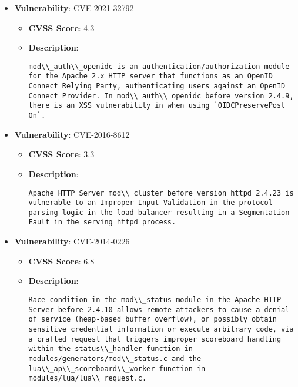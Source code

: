 \documentclass{article}
\begin{document}
\begin{itemize}
        \item \textbf{Vulnerability}: CVE-2021-32792
        \begin{itemize}
            \item \textbf{CVSS Score}:  4.3 
            \item \textbf{Description}:
            \parbox[t]{0.9\linewidth}{
                \verb|mod\\_auth\\_openidc is an authentication/authorization module for the Apache 2.x HTTP server that functions as an OpenID Connect Relying Party, authenticating users against an OpenID Connect Provider. In mod\\_auth\\_openidc before version 2.4.9, there is an XSS vulnerability in when using `OIDCPreservePost On`.|
            }
        \end{itemize}
    
        \item \textbf{Vulnerability}: CVE-2016-8612
        \begin{itemize}
            \item \textbf{CVSS Score}:  3.3 
            \item \textbf{Description}:
            \parbox[t]{0.9\linewidth}{
                \verb|Apache HTTP Server mod\\_cluster before version httpd 2.4.23 is vulnerable to an Improper Input Validation in the protocol parsing logic in the load balancer resulting in a Segmentation Fault in the serving httpd process.|
            }
        \end{itemize}
    
        \item \textbf{Vulnerability}: CVE-2014-0226
        \begin{itemize}
            \item \textbf{CVSS Score}:  6.8 
            \item \textbf{Description}:
            \parbox[t]{0.9\linewidth}{
                \verb|Race condition in the mod\\_status module in the Apache HTTP Server before 2.4.10 allows remote attackers to cause a denial of service (heap-based buffer overflow), or possibly obtain sensitive credential information or execute arbitrary code, via a crafted request that triggers improper scoreboard handling within the status\\_handler function in modules/generators/mod\\_status.c and the lua\\_ap\\_scoreboard\\_worker function in modules/lua/lua\\_request.c.|
            }
        \end{itemize}
    

\end{itemize}
\end{document}
